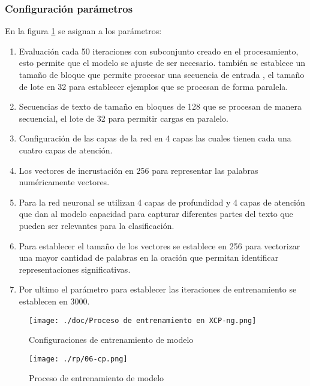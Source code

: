 \subsubsection{Configuración parámetros}\label{section:Configuración de los parámetros del código} 
En la figura \ref{figure:Configuraciones modelo entrenamiento 2} se asignan a los parámetros:
\begin{enumerate}
	\item Evaluación cada 50 iteraciones con subconjunto creado en el procesamiento, esto permite que el modelo se ajuste de ser necesario. también se establece un tamaño de bloque que permite procesar una secuencia de entrada , el tamaño de lote en 32 para establecer ejemplos que se procesan de forma paralela.
	\item Secuencias de texto de tamaño en bloques de 128 que se procesan de manera secuencial, el lote de 32 para permitir cargas en paralelo.
	\item Configuración de las capas de la red en 4 capas las cuales tienen cada una cuatro capas de atención.
	\item Los vectores de incrustación en 256 para representar las palabras numéricamente vectores.
	\item Para la red neuronal se utilizan 4 capas de profundidad y 4 capas de atención que dan al modelo capacidad para capturar diferentes partes del texto que pueden ser relevantes para la clasificación. 
	\item Para establecer el tamaño de los vectores se establece en 256 para vectorizar una mayor cantidad de palabras en la oración  que permitan identificar representaciones significativas.
	\item Por ultimo el parámetro para establecer las iteraciones de entrenamiento se establecen en 3000. 
\end{enumerate} 
\begin{figure}[H]
   \centering %
       \texttt{[image: ./doc/Proceso de entrenamiento en XCP-ng.png]} 
   \caption{Configuraciones de entrenamiento de modelo  \cite{}}
  \label{figure:Configuraciones modelo entrenamiento 2}  %
\end{figure}
\begin{figure}[H]
   \centering %
       \texttt{[image: ./rp/06-cp.png]} 
   \caption{Proceso de entrenamiento de modelo\cite{}}
  \label{figure:Proceso de entrenamiento del modelo}  %
\end{figure}
\clearpage
